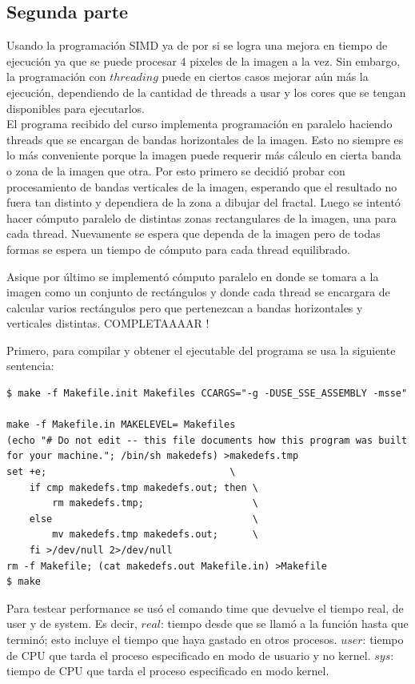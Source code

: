 \documentclass[a4paper,10pt]{article}
\begin{document}
\subsection{Segunda parte}
Usando la programación SIMD ya de por si se logra una mejora en tiempo de ejecución ya que se puede procesar 4 pixeles de la imagen a la vez. Sin embargo, la programación con $threading$ puede en ciertos casos mejorar aún más la ejecución, dependiendo de la cantidad de threads a usar y los cores que se tengan disponibles para ejecutarlos.\\
El programa recibido del curso implementa programación en paralelo haciendo threads que se encargan de bandas horizontales de la imagen. Esto no siempre es lo más conveniente porque la imagen puede requerir más cálculo en cierta banda o zona de la imagen que otra.
Por esto primero se decidió probar con procesamiento de bandas verticales de la imagen, esperando que el resultado no fuera tan distinto y dependiera de la zona a dibujar del fractal.
Luego se intentó hacer cómputo paralelo de distintas zonas rectangulares de la imagen, una para cada thread. Nuevamente se espera que dependa de la imagen pero de todas formas se espera un tiempo de cómputo para cada thread equilibrado.

Asique por último se implementó cómputo paralelo en donde se tomara a la imagen como un conjunto de rectángulos y donde cada thread se encargara de calcular varios rectángulos pero que pertenezcan a bandas horizontales y verticales distintas.
COMPLETAAAAR !


Primero, para compilar y obtener el ejecutable del programa se usa la siguiente sentencia:
\begin{verbatim}
$ make -f Makefile.init Makefiles CCARGS="-g -DUSE_SSE_ASSEMBLY -msse"

make -f Makefile.in MAKELEVEL= Makefiles
(echo "# Do not edit -- this file documents how this program was built for your machine."; /bin/sh makedefs) >makedefs.tmp
set +e;                                \
	if cmp makedefs.tmp makedefs.out; then \
	    rm makedefs.tmp;                   \
	else                                   \
	    mv makedefs.tmp makedefs.out;      \
	fi >/dev/null 2>/dev/null
rm -f Makefile; (cat makedefs.out Makefile.in) >Makefile
$ make
\end{verbatim}


Para testear performance se usó el comando time que devuelve el tiempo real, de user y de system. Es decir,
$real$: tiempo desde que se llamó a la función hasta que terminó; esto incluye el tiempo que haya gastado en otros procesos.
$user$: tiempo de CPU que tarda el proceso especificado en modo de usuario y no kernel.
$sys$: tiempo de CPU que tarda el proceso especificado en modo kernel.
\end{document}
